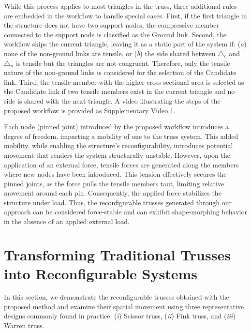 While this process applies to most triangles in the truss, three additional rules are embedded in the workflow to handle special cases. First, if the first triangle in the structure does not have two support nodes, the compressive member connected to the support node is classified as the Ground link. Second, the workflow skips the current triangle, leaving it as a static part of the system if: (\textit{a}) none of the non-ground links are tensile, or (\textit{b}) the side shared between \(\triangle_c\) and \(\triangle_n\) is tensile but the triangles are not congruent. Therefore, only the tensile nature of the non-ground links is considered for the selection of the Candidate link. Third, the tensile member with the higher cross-sectional area is selected as the Candidate link if two tensile members exist in the current triangle and no side is shared with the next triangle. A video illustrating the steps of the proposed workflow is provided as \hyperref[fig-supplementary-video-1]{Supplementary Video 1}.

Each node (pinned joint) introduced by the proposed workflow introduces a degree of freedom, imparting a mobility of one to the truss system. This added mobility, while enabling the structure's reconfigurability, introduces potential movement that renders the system structurally unstable. However, upon the application of an external force, tensile forces are generated along the members where new nodes have been introduced. This tension effectively secures the pinned joints, as the force pulls the tensile members taut, limiting relative movement around each pin. Consequently, the applied force stabilizes the structure under load. Thus, the reconfigurable trusses generated through our approach can be considered force-stable and can exhibit shape-morphing behavior in the absence of an applied external load.

\section{Transforming Traditional Trusses into Reconfigurable Systems}\label{02-sec-traditional-trusses}
In this section, we demonstrate the reconfigurable trusses obtained with the proposed method and examine their spatial movement using three representative designs commonly found in practice:
(\textit{i}) Scissor truss,
(\textit{ii}) Fink truss, and
(\textit{iii}) Warren truss.

